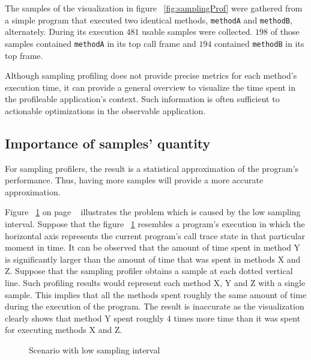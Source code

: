 \documentclass[..thesis.tex]{subfiles}
\begin{document}
The samples of the visualization in figure ~\ref{fig:samplingProf} were gathered from a simple program that executed two identical methods, \texttt{methodA} and \texttt{methodB}, alternately. During its execution $481$ usable samples were collected. $198$ of those samples contained \texttt{methodA} in its top call frame and $194$ contained \texttt{methodB} in its top frame.

Although sampling profiling does not provide precise metrics for each method's execution time, it can provide a general overview to visualize the time spent in the profileable application's context. Such information is often sufficient to actionable optimizations in the observable application.


\subsection{Importance of samples' quantity}

For sampling profilers, the result is a statistical approximation of the program's performance. Thus, having more samples will provide a more accurate approximation. 

Figure ~\ref{fig:lowSampleCount} on page ~\pageref{fig:lowSampleCount} illustrates the problem which is caused by the low sampling interval. Suppose that the figure ~\ref{fig:lowSampleCount} resembles a program's execution in which the horizontal axis represents the current program's call trace state in that particular moment in time. It can be observed that the amount of time spent in method Y is significantly larger than the amount of time that was spent in methods X and Z. Suppose that the sampling profiler obtains a sample at each dotted vertical line. Such profiling results would represent each method X, Y and Z with a single sample. This implies that all the methods spent roughly the same amount of time during the execution of the program. The result is inaccurate as the visualization clearly shows that method Y spent roughly 4 times more time than it was spent for executing methods X and Z.

\begin{figure}[H]
\centering
{}
\caption{Scenario with low sampling interval}
\label{fig:lowSampleCount}
\end{figure}
\end{document}
